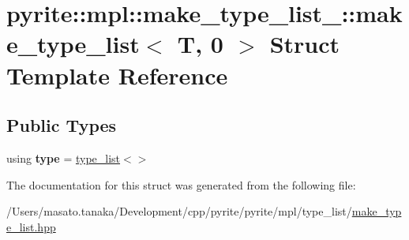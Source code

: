 \hypertarget{structpyrite_1_1mpl_1_1make__type__list___1_1make__type__list_3_01_t_00_010_01_4}{}\section{pyrite\+:\+:mpl\+:\+:make\+\_\+type\+\_\+list\+\_\+\+:\+:make\+\_\+type\+\_\+list$<$ T, 0 $>$ Struct Template Reference}
\label{structpyrite_1_1mpl_1_1make__type__list___1_1make__type__list_3_01_t_00_010_01_4}
\subsection*{Public Types}
\begin{DoxyCompactItemize}
\item 
\mbox{\label{structpyrite_1_1mpl_1_1make__type__list___1_1make__type__list_3_01_t_00_010_01_4_aa8ea8a480094972a2d355db8025fa380}} 
using {\bfseries type} = \mbox{\hyperlink{structpyrite_1_1core_1_1mpl_1_1type__list}{type\+\_\+list}}$<$$>$
\end{DoxyCompactItemize}


The documentation for this struct was generated from the following file\+:\begin{DoxyCompactItemize}
\item 
/\+Users/masato.\+tanaka/\+Development/cpp/pyrite/pyrite/mpl/type\+\_\+list/\mbox{\hyperlink{make__type__list_8hpp}{make\+\_\+type\+\_\+list.\+hpp}}\end{DoxyCompactItemize}
